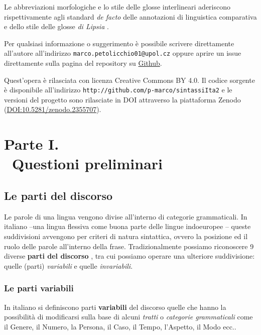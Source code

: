 \documentclass[a4paper,twoside,11pt,chapterprefix=false,bibliography=totocnumbered,listof=flat]{scrbook}
\begin{document}
Le abbreviazioni morfologiche e lo stile delle glosse interlineari
aderiscono rispettivamente agli standard \emph{de facto} delle
annotazioni di linguistica comparativa
\citep[\href{http://www.oxfordhandbooks.com/view/10.1093/oxfordhb/9780199549368.001.0001/oxfordhb-9780199549368}{consultabile
online}]{boeckxListOfAbbreviations} e dello stile delle glosse \emph{di
Lipsia} \citep{leipzigGlossingRules}.

Per qualsiasi informazione o suggerimento è possibile scrivere
direttamente all'autore all'indirizzo
\texttt{marco.petolicchio01@upol.cz} oppure aprire un issue direttamente
sulla pagina del repository su
\href{http://github.com/p-marco/sintassiIta2}{Github}.

Quest'opera è rilasciata con licenza Creative Commons BY 4.0. Il codice
sorgente è disponibile all'indirizzo
\texttt{http://github.com/p-marco/sintassiIta2} e le versioni del
progetto sono rilasciate in DOI attraverso la piattaforma Zenodo
(\url{DOI:10.5281/zenodo.2355707}).

\mainmatter

\part*{Parte I. \\\ Questioni preliminari}

\hypertarget{le-parti-del-discorso}{%
\chapter{Le parti del discorso}\label{le-parti-del-discorso}}

Le parole di una lingua vengono divise all'interno di categorie
grammaticali. In italiano --una lingua flessiva come buona parte delle
lingue indoeuropee \citep{graffiScalise2009}-- queste suddivisioni
avvengono per criteri di natura sintattica, ovvero la posizione ed il
ruolo delle parole all'interno della frase. Tradizionalmente possiamo
riconoscere 9 diverse \textbf{parti del discorso} \citep{salvi2013}, tra
cui possiamo operare una ulteriore suddivisione: quelle (parti)
\emph{variabili} e quelle \emph{invariabili}.

\hypertarget{le-parti-variabili}{%
\section{Le parti variabili}\label{le-parti-variabili}}

In italiano si definiscono parti \textbf{variabili} del discorso quelle
che hanno la possibilità di modificarsi sulla base di alcuni
\emph{tratti} o \emph{categorie grammaticali} \citep[ Cap.9]{simone1995}
come il Genere, il Numero, la Persona, il Caso, il Tempo, l'Aspetto, il
Modo ecc..
\end{document}
